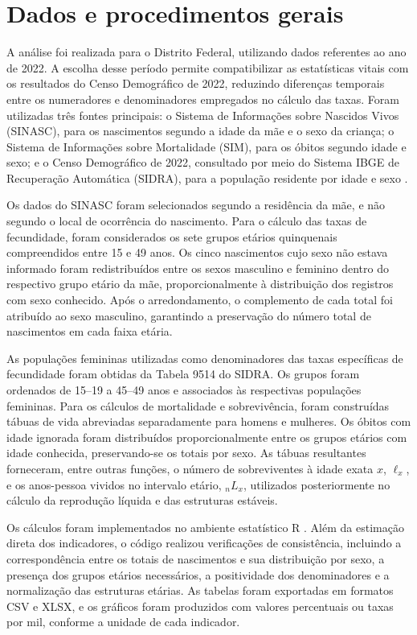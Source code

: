 \documentclass[a4paper,12pt]{article}
\begin{document}
\section{Dados e procedimentos gerais}

A análise foi realizada para o Distrito Federal, utilizando dados referentes ao ano de 2022. A escolha desse período permite compatibilizar as estatísticas vitais com os resultados do Censo Demográfico de 2022, reduzindo diferenças temporais entre os numeradores e denominadores empregados no cálculo das taxas. Foram utilizadas três fontes principais: o Sistema de Informações sobre Nascidos Vivos (SINASC), para os nascimentos segundo a idade da mãe e o sexo da criança; o Sistema de Informações sobre Mortalidade (SIM), para os óbitos segundo idade e sexo; e o Censo Demográfico de 2022, consultado por meio do Sistema IBGE de Recuperação Automática (SIDRA), para a população residente por idade e sexo \cite{datasussinasc2022,datasussim2022,ibge2022censo,ibgesidra9514}.

Os dados do SINASC foram selecionados segundo a residência da mãe, e não segundo o local de ocorrência do nascimento. Para o cálculo das taxas de fecundidade, foram considerados os sete grupos etários quinquenais compreendidos entre 15 e 49 anos. Os cinco nascimentos cujo sexo não estava informado foram redistribuídos entre os sexos masculino e feminino dentro do respectivo grupo etário da mãe, proporcionalmente à distribuição dos registros com sexo conhecido. Após o arredondamento, o complemento de cada total foi atribuído ao sexo masculino, garantindo a preservação do número total de nascimentos em cada faixa etária.

As populações femininas utilizadas como denominadores das taxas específicas de fecundidade foram obtidas da Tabela 9514 do SIDRA. Os grupos foram ordenados de 15--19 a 45--49 anos e associados às respectivas populações femininas. Para os cálculos de mortalidade e sobrevivência, foram construídas tábuas de vida abreviadas separadamente para homens e mulheres. Os óbitos com idade ignorada foram distribuídos proporcionalmente entre os grupos etários com idade conhecida, preservando-se os totais por sexo. As tábuas resultantes forneceram, entre outras funções, o número de sobreviventes à idade exata \(x\), \(\ell_x\), e os anos-pessoa vividos no intervalo etário, \({}_nL_x\), utilizados posteriormente no cálculo da reprodução líquida e das estruturas estáveis.

Os cálculos foram implementados no ambiente estatístico R \cite{rproject}. Além da estimação direta dos indicadores, o código realizou verificações de consistência, incluindo a correspondência entre os totais de nascimentos e sua distribuição por sexo, a presença dos grupos etários necessários, a positividade dos denominadores e a normalização das estruturas etárias. As tabelas foram exportadas em formatos CSV e XLSX, e os gráficos foram produzidos com valores percentuais ou taxas por mil, conforme a unidade de cada indicador.
\end{document}
